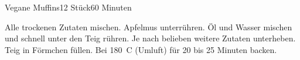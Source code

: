 \documentclass[a4paper,10pt]{article}
\begin{document}
    \begin{recipe}{Vegane Muffins}{12 Stück}{60 Minuten}

        \freeform \hfill 

            Alle trockenen Zutaten mischen.
            Apfelmus unterrühren.
            Öl und Wasser mischen und schnell unter den Teig rühren.
            Je nach belieben weitere Zutaten unterheben.
        \newstep
            Teig in Förmchen füllen. Bei 180~\degrees C (Umluft) für 20 bis 25 Minuten backen.

    \end{recipe}

    \newpage
\end{document}
